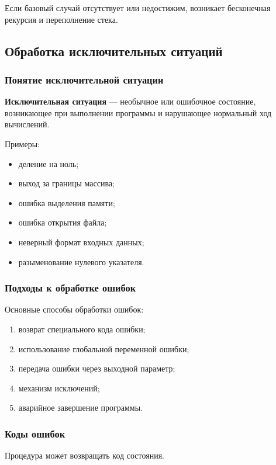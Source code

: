 \documentclass[12pt,a4paper]{article}
\begin{document}
Если базовый случай отсутствует или недостижим, возникает бесконечная рекурсия и переполнение стека.

\subsection{Обработка исключительных ситуаций}

\subsubsection{Понятие исключительной ситуации}

\textbf{Исключительная ситуация} --- необычное или ошибочное состояние, возникающее при выполнении программы и нарушающее нормальный ход вычислений.

Примеры:
\begin{itemize}
    \item деление на ноль;
    \item выход за границы массива;
    \item ошибка выделения памяти;
    \item ошибка открытия файла;
    \item неверный формат входных данных;
    \item разыменование нулевого указателя.
\end{itemize}

\subsubsection{Подходы к обработке ошибок}

Основные способы обработки ошибок:
\begin{enumerate}
    \item возврат специального кода ошибки;
    \item использование глобальной переменной ошибки;
    \item передача ошибки через выходной параметр;
    \item механизм исключений;
    \item аварийное завершение программы.
\end{enumerate}

\subsubsection{Коды ошибок}

Процедура может возвращать код состояния.
\end{document}
